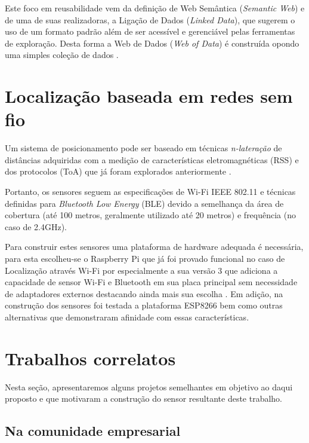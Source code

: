 Este foco em reusabilidade vem da definição de Web Semântica (\emph{Semantic
Web}) e de uma de suas realizadoras, a Ligação de Dados (\emph{Linked Data}),
que sugerem o uso de um formato padrão além de ser acessível e gerenciável pelas
ferramentas de exploração. Desta forma a Web de Dados (\emph{Web of Data}) é
construída opondo uma simples coleção de dados \cite{Bizer2009}.

\section{Localização baseada em redes sem fio}
\label{sec:Localização baseada em redes sem fio}

Um sistema de posicionamento pode ser baseado em técnicas
\emph{n-lateração} de distâncias adquiridas com a medição de características
eletromagnéticas (RSS) e dos protocolos (ToA) que já foram explorados anteriormente \cite{Abusubaih2007,
bahillo2009ieee, Feldmann2003}.

Portanto, os sensores seguem as especificações de Wi-Fi IEEE 802.11
\cite{Crow1997} e técnicas definidas para \emph{Bluetooth Low Energy} (BLE)
\cite{Hossain2007} devido a semelhança da área de cobertura (até 100 metros,
geralmente utilizado até 20 metros) e frequência (no caso de 2.4GHz).

Para construir estes sensores uma plataforma de hardware adequada é necessária,
para esta escolheu-se o Raspberry Pi \cite{Vujovic2014, Vujovic2015} que já
foi provado funcional no caso de Localização através Wi-Fi por
 especialmente a sua versão 3 que adiciona a capacidade
de sensor Wi-Fi e Bluetooth em sua placa principal sem
necessidade de adaptadores externos destacando ainda mais sua escolha
\cite{RPI2016}. Em adição, na construção dos sensores foi testada a plataforma ESP8266 bem como
outras alternativas que demonstraram afinidade com essas características.


\section{Trabalhos correlatos}
\label{Trabalhos correlatos}
Nesta seção, apresentaremos alguns projetos semelhantes em objetivo ao daqui
proposto e que motivaram a construção do sensor resultante deste trabalho.

\subsection{Na comunidade empresarial}
\label{subsec:na comunidade empresarial}


